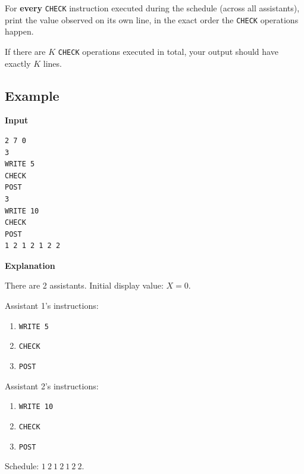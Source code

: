 For \textbf{every} \texttt{CHECK} instruction executed during the schedule
(across all assistants), print the value observed on its own line, in the exact
order the \texttt{CHECK} operations happen.

If there are \(K\) \texttt{CHECK} operations executed in total, your output
should have exactly \(K\) lines.

\subsection*{Example}

\textbf{Input}
\begin{verbatim}
2 7 0
3
WRITE 5
CHECK
POST
3
WRITE 10
CHECK
POST
1 2 1 2 1 2 2
\end{verbatim}

\textbf{Explanation}

There are 2 assistants. Initial display value: \(X = 0\).

Assistant 1's instructions:
\begin{enumerate}[nosep]
    \item \texttt{WRITE 5}
    \item \texttt{CHECK}
    \item \texttt{POST}
\end{enumerate}

Assistant 2's instructions:
\begin{enumerate}[nosep]
    \item \texttt{WRITE 10}
    \item \texttt{CHECK}
    \item \texttt{POST}
\end{enumerate}

Schedule: \(1\ 2\ 1\ 2\ 1\ 2\ 2\).

